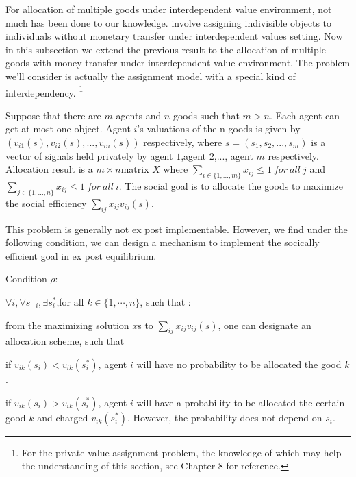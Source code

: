 For allocation of multiple goods under interdependent value environment, not much has been done to our knowledge. \parencite{Che2015} involve assigning indivisible objects to individuals without monetary transfer under interdependent values setting. Now in this subsection we extend the previous result to the allocation of multiple goods with money transfer under interdependent value environment.  The problem we'll consider is actually the assignment model with a special kind of interdependency. \footnote{For the private value assignment problem, the knowledge of which may help the understanding of this section, see Chapter 8 \parencite{Roth1990}for reference.} 

Suppose that there are $m$ agents and $n$ goods such that $m > n$. Each agent can get at most one object.   Agent $i$'s valuations of the n goods is given by $(v_{i1}(s),v_{i2}(s),...,v_{in}(s))$ respectively, where $s=(s_1,s_2,...,s_m)$ is a vector of signals held privately by agent $1$,agent $2$,..., agent $m$ respectively. Allocation result is a $m \times n$matrix $X$ where $\sum_{i\in\{1,...,m\}}x_{ij} \leq 1\ for\ all\ j$ and  $\sum_{j\in\{1,...,n\}}x_{ij} \leq 1\ for\ all\ i$. The social goal is to allocate the goods to maximize the social efficiency $\sum_{ij}x_{ij}v_{ij}(s)$.

This problem is generally not ex post implementable. However, we find under the following condition, we can design a mechanism to implement the socically efficient goal in ex post equilibrium.

Condition $\rho$:

$\forall i,\forall s_{-i}, \exists s_i^*$,for all $k \in \{1,\cdots,n\}$, such that :

from the maximizing solution $x$s to  $\sum_{ij}x_{ij}v_{ij}(s)$, one can designate an allocation scheme, such that


if $v_{ik}(s_i) < v_{ik}(s_i^*)$, agent $i$ will have no probability to be allocated the good $k$. %

if $v_{ik}(s_i) > v_{ik}(s_i^*)$, agent $i$ will have a probability to be allocated the certain good $k$ and charged $ v_{ik}(s_i^*)$. However, the probability does not depend on $s_i$. %


